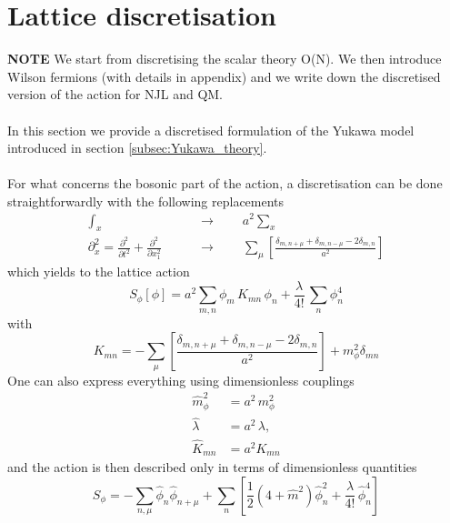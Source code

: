 \section{Lattice discretisation}
\label{sec:lattice_discretisation}
\textbf{NOTE} We start from discretising the scalar theory O(N). We then introduce Wilson fermions (with details in appendix) and we write down the discretised version of the action for NJL and QM. \\~\\
In this section we provide a discretised formulation of the Yukawa model introduced in section \ref{subsec:Yukawa_theory}. \\~\\
For what concerns the bosonic part of the action, a discretisation can be done straightforwardly with the following replacements
\begin{equation*}
    \begin{aligned}
        \int_x \qquad &\to \qquad a^2 \sum_x \\
        \partial^2_x = \frac{\partial^2}{\partial t^2} + \frac{\partial^2}{\partial x_1^2} \qquad &\to \qquad \sum_\mu \left[\frac{\delta_{m,n+\mu} + \delta_{m,n-\mu} - 2 \delta_{m,n}}{a^2}\right]
    \end{aligned}
\end{equation*}
which yields to the lattice action
\begin{equation*}
        S_\phi [\phi] =  a^2 \sum_{m,n} \phi_m \, K_{mn} \, \phi_n + \frac{\lambda}{4!} \, \sum_n \phi_n^4 
\end{equation*}
with 
\begin{equation*}
    K_{mn} = - \sum_\mu \left[\frac{\delta_{m,n+\mu} + \delta_{m,n-\mu} - 2 \delta_{m,n}}{a^2}\right] + m_\phi^2 \delta_{mn} 
\end{equation*}
One can also express everything using dimensionless couplings
\begin{equation}
    \begin{aligned}
        \hat m_\phi^2 &= a^2 \, m_\phi^2 \\
        \hat \lambda &= a^{2} \, \lambda, \\
        \hat K_{mn} &= a^2 K_{mn}
    \end{aligned}
    \label{eq:couplings_redefitinion}
\end{equation}
and the action is then described only in terms of dimensionless quantities
\begin{equation*}
    S_\phi=-\sum_{n, \mu} \hat\phi_n \hat\phi_{n+\mu}+\sum_n\left[\frac{1}{2}\left(4+\hat m^2\right) \hat\phi_n^2 +\frac{\hat\lambda}{4 !} \, \hat\phi_n^4\right]
\end{equation*}
